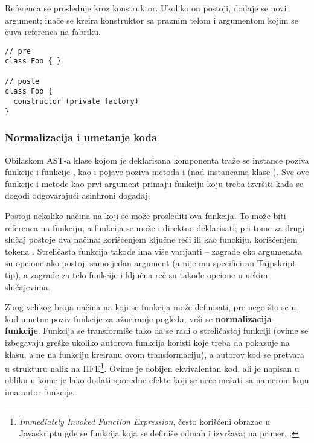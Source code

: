Referenca se prosleđuje kroz konstruktor.
Ukoliko on postoji, dodaje se novi argument; inače se kreira konstruktor sa praznim telom i argumentom kojim se čuva referenca na fabriku.

\begin{lstlisting}
// pre
class Foo { }

// posle
class Foo { 
  constructor (private factory)
}
\end{lstlisting}

\subsubsection{Normalizacija i umetanje koda}

Obilaskom AST-a klase kojom je deklarisana komponenta traže se instance poziva funkcije  i funkcije , kao i pojave poziva metoda  i  (nad instancama klase ).
Sve ove funkcije i metode kao prvi argument primaju funkciju koju treba izvršiti kada se dogodi odgovarajući asinhroni događaj.

Postoji nekoliko načina na koji se može proslediti ova funkcija.
To može biti referenca na funkciju, a funkcija se može i direktno deklarisati; pri tome za drugi slučaj postoje dva načina: korišćenjem ključne reči  ili kao  funckiju, korišćenjem tokena \code{=>}.
Streličasta funkcija takođe ima više varijanti -- zagrade oko argumenata su opcione ako postoji samo jedan argument (a nije mu specificiran Tajpskript tip), a zagrade za telo funkcije i ključna reč  su takođe opcione u nekim slučajevima.


Zbog velikog broja načina na koji se funkcija može definisati, pre nego što se u kod umetne poziv funkcije za ažuriranje pogleda, vrši se \textbf{normalizacija funkcije}.
Funkcija se transformiše tako da se radi o streličastoj funkciji (ovime se izbegavaju greške ukoliko autorova funkcija koristi  koje treba da pokazuje na klasu, a ne na funkciju kreiranu ovom transformaciju), a autorov kod se pretvara u strukturu nalik na IIFE\footnote{\textsl{Immediately Invoked Function Expression}, često korišćeni obrazac u Javaskriptu gde se funkcija koja se definiše odmah i izvršava; na primer, .}.
Ovime je dobijen ekvivalentan kod, ali je napisan u obliku u kome je lako dodati sporedne efekte koji se neće mešati sa namerom koju ima autor funkcije.

